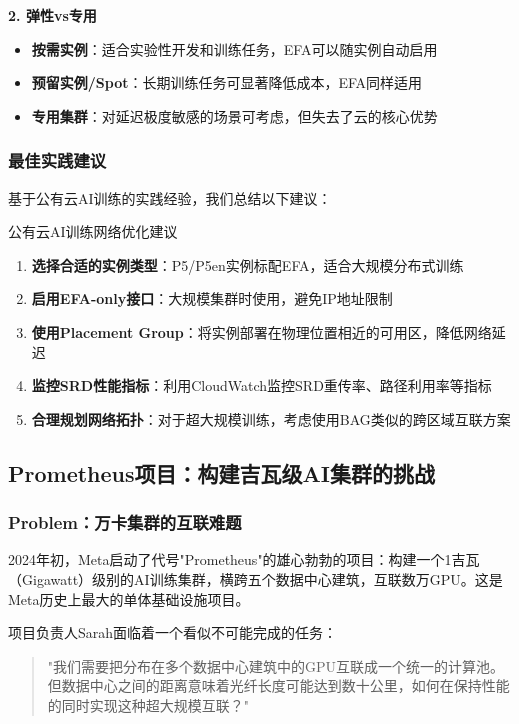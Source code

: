 \textbf{2. 弹性vs专用}

\begin{itemize}
    \item \textbf{按需实例}：适合实验性开发和训练任务，EFA可以随实例自动启用
    \item \textbf{预留实例/Spot}：长期训练任务可显著降低成本，EFA同样适用
    \item \textbf{专用集群}：对延迟极度敏感的场景可考虑，但失去了云的核心优势
\end{itemize}

\subsubsection{最佳实践建议}

基于公有云AI训练的实践经验，我们总结以下建议：

\begin{insightbox}{公有云AI训练网络优化建议}
\begin{enumerate}
    \item \textbf{选择合适的实例类型}：P5/P5en实例标配EFA，适合大规模分布式训练
    \item \textbf{启用EFA-only接口}：大规模集群时使用，避免IP地址限制
    \item \textbf{使用Placement Group}：将实例部署在物理位置相近的可用区，降低网络延迟
    \item \textbf{监控SRD性能指标}：利用CloudWatch监控SRD重传率、路径利用率等指标
    \item \textbf{合理规划网络拓扑}：对于超大规模训练，考虑使用BAG类似的跨区域互联方案
\end{enumerate}
\end{insightbox}

\subsection{Prometheus项目：构建吉瓦级AI集群的挑战}

\subsubsection{Problem：万卡集群的互联难题}

2024年初，Meta启动了代号"Prometheus"的雄心勃勃的项目：构建一个1吉瓦（Gigawatt）级别的AI训练集群，横跨五个数据中心建筑，互联数万GPU。这是Meta历史上最大的单体基础设施项目。

项目负责人Sarah面临着一个看似不可能完成的任务：

\begin{quote}
"我们需要把分布在多个数据中心建筑中的GPU互联成一个统一的计算池。但数据中心之间的距离意味着光纤长度可能达到数十公里，如何在保持性能的同时实现这种超大规模互联？"
\end{quote}


